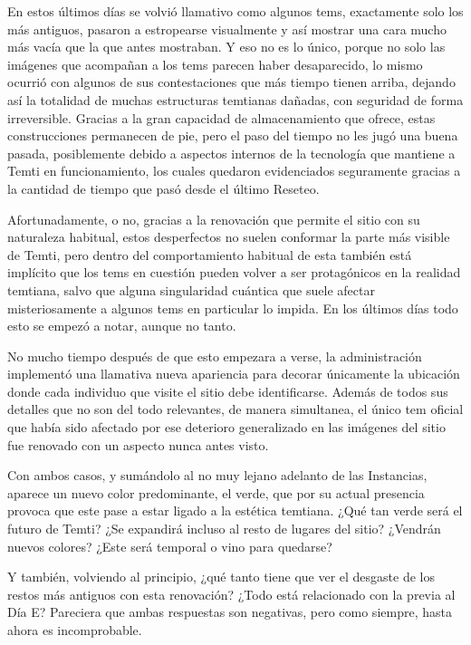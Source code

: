 \documentclass[
  spanish,
]{book}
\begin{document}
En estos últimos días se volvió llamativo como algunos tems, exactamente solo los más antiguos, pasaron a estropearse visualmente y así mostrar una cara mucho más vacía que la que antes mostraban. Y eso no es lo único, porque no solo las imágenes que acompañan a los tems parecen haber desaparecido, lo mismo ocurrió con algunos de sus contestaciones que más tiempo tienen arriba, dejando así la totalidad de muchas estructuras temtianas dañadas, con seguridad de forma irreversible. Gracias a la gran capacidad de almacenamiento que ofrece, estas construcciones permanecen de pie, pero el paso del tiempo no les jugó una buena pasada, posiblemente debido a aspectos internos de la tecnología que mantiene a Temti en funcionamiento, los cuales quedaron evidenciados seguramente gracias a la cantidad de tiempo que pasó desde el último Reseteo.

Afortunadamente, o no, gracias a la renovación que permite el sitio con su naturaleza habitual, estos desperfectos no suelen conformar la parte más visible de Temti, pero dentro del comportamiento habitual de esta también está implícito que los tems en cuestión pueden volver a ser protagónicos en la realidad temtiana, salvo que alguna singularidad cuántica que suele afectar misteriosamente a algunos tems en particular lo impida. En los últimos días todo esto se empezó a notar, aunque no tanto.

No mucho tiempo después de que esto empezara a verse, la administración implementó una llamativa nueva apariencia para decorar únicamente la ubicación donde cada individuo que visite el sitio debe identificarse. Además de todos sus detalles que no son del todo relevantes, de manera simultanea, el único tem oficial que había sido afectado por ese deterioro generalizado en las imágenes del sitio fue renovado con un aspecto nunca antes visto.

Con ambos casos, y sumándolo al no muy lejano adelanto de las Instancias, aparece un nuevo color predominante, el verde, que por su actual presencia provoca que este pase a estar ligado a la estética temtiana. ¿Qué tan verde será el futuro de Temti? ¿Se expandirá incluso al resto de lugares del sitio? ¿Vendrán nuevos colores? ¿Este será temporal o vino para quedarse?

Y también, volviendo al principio, ¿qué tanto tiene que ver el desgaste de los restos más antiguos con esta renovación? ¿Todo está relacionado con la previa al Día E? Pareciera que ambas respuestas son negativas, pero como siempre, hasta ahora es incomprobable.
\end{document}
